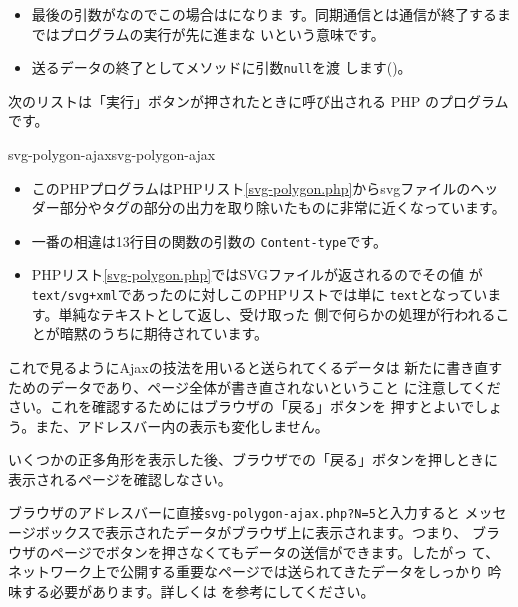\begin{itemize}
       関数を使用してURIで使用できない文字をエスケープ
       (別の表記法に変える)します。
       ここで渡される値はたとえば次のようになります。
\begin{center}
 \verb+./svg-polygon-ajax.php?N=5+
\end{center}
引数が複数あるときは\texttt{\&}で区切ります
\footnote{検索サイトで日本語の検索文
       字列を入れるとアドレスバーに日本語が現れずに\%が入った文字列が見
       えます。これは、日本語をUTF-8でエンコーディングしてから16進数で表
       記したものに変えているからです。}。
なお、呼び出
       されたphpプログラムではこの値を\Verb+$_GET['N']+で利用できます。
 \item 最後の引数がなのでこの場合はになりま
       す。同期通信とは通信が終了するまではプログラムの実行が先に進まな
       いという意味です。
 \item 送るデータの終了としてメソッドに引数\texttt{null}を渡
       します()。
\end{itemize}

次のリストは「実行」ボタンが押されたときに呼び出される PHP のプログラム
です。%

    {svg-polygon-ajax}{svg-polygon-ajax}
\begin{itemize}
 \item このPHPプログラムはPHPリスト\ref{svg-polygon.php}からsvgファイルのヘッ
ダー部分やタグの部分の出力を取り除いたものに非常に近くなっています。
 \item 一番の相違は13行目の関数の引数の
       \texttt{Content-type}です。
 \item PHPリスト\ref{svg-polygon.php}ではSVGファイルが返されるのでその値
       が\texttt{text/svg+xml}であったのに対しこのPHPリストでは単に
       \texttt{text}となっています。単純なテキストとして返し、受け取った
       側で何らかの処理が行われることが暗黙のうちに期待されています。
\end{itemize}

これで見るようにAjaxの技法を用いると送られてくるデータは
  新たに書き直すためのデータであり、ページ全体が書き直されないということ
  に注意してください。これを確認するためにはブラウザの「戻る」ボタンを
  押すとよいでしょう。また、アドレスバー内の表示も変化しません。
\begin{Problem}\upshape
 いくつかの正多角形を表示した後、ブラウザでの「戻る」ボタンを押しときに
 表示されるページを確認しなさい。

\iffalse
同様のことを \keyitem{Google Map}でも行いなさい。特に、検索をした後どう
 なるかを調べなさい。
\fi
\end{Problem}
ブラウザのアドレスバーに直接\verb+svg-polygon-ajax.php?N=5+と入力すると
メッセージボックスで表示されたデータがブラウザ上に表示されます。つまり、
ブラウザのページでボタンを押さなくてもデータの送信ができます。したがっ
て、ネットワーク上で公開する重要なページでは送られてきたデータをしっかり
吟味する必要があります。詳しくは\cite{PHPSecurity}%
を参考にしてください。

